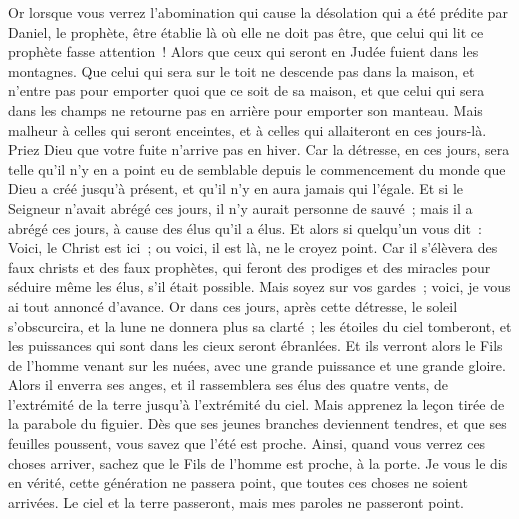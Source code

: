 \begin{multicols}{2}
Or lorsque vous verrez l'abomination qui cause la désolation qui a été prédite par Daniel, le prophète, être établie là où elle ne doit pas être, que celui qui lit ce prophète fasse attention~! Alors que ceux qui seront en Judée fuient dans les montagnes.
Que celui qui sera sur le toit ne descende pas dans la maison, et n'entre pas pour emporter quoi que ce soit de sa maison,
et que celui qui sera dans les champs ne retourne pas en arrière pour emporter son manteau.
Mais malheur à celles qui seront enceintes, et à celles qui allaiteront en ces jours-là.
Priez Dieu que votre fuite n'arrive pas en hiver.
Car la détresse, en ces jours, sera telle qu'il n'y en a point eu de semblable depuis le commencement du monde que Dieu a créé jusqu'à présent, et qu'il n'y en aura jamais qui l'égale.
Et si le Seigneur n'avait abrégé ces jours, il n'y aurait personne de sauvé~; mais il a abrégé ces jours, à cause des élus qu'il a élus.
Et alors si quelqu'un vous dit~: Voici, le Christ est ici~; ou voici, il est là, ne le croyez point.
Car il s'élèvera des faux christs et des faux prophètes, qui feront des prodiges et des miracles pour séduire même les élus, s'il était possible.
Mais soyez sur vos gardes~; voici, je vous ai tout annoncé d'avance.
Or dans ces jours, après cette détresse, le soleil s'obscurcira, et la lune ne donnera plus sa clarté~;
les étoiles du ciel tomberont, et les puissances qui sont dans les cieux seront ébranlées.
Et ils verront alors le Fils de l'homme venant sur les nuées, avec une grande puissance et une grande gloire.
Alors il enverra ses anges, et il rassemblera ses élus des quatre vents, de l'extrémité de la terre jusqu'à l'extrémité du ciel.
Mais apprenez la leçon tirée de la parabole du figuier. Dès que ses jeunes branches deviennent tendres, et que ses feuilles poussent, vous savez que l'été est proche.
Ainsi, quand vous verrez ces choses arriver, sachez que le Fils de l'homme est proche, à la porte.
Je vous le dis en vérité, cette génération ne passera point, que toutes ces choses ne soient arrivées.
Le ciel et la terre passeront, mais mes paroles ne passeront point.

\end{multicols}
